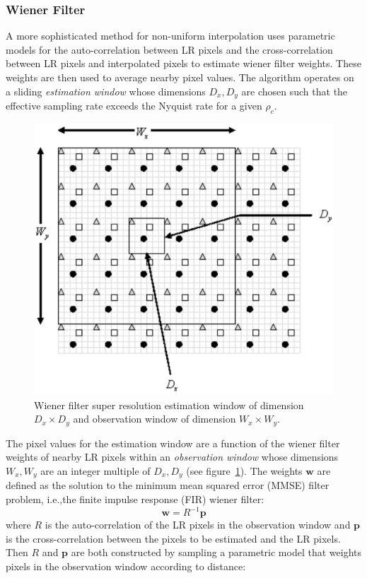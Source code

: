 \subsubsection{Wiener Filter}
A more sophisticated method for non-uniform interpolation uses parametric models for the auto-correlation between LR pixels and the cross-correlation between LR pixels and interpolated pixels to estimate wiener filter weights\cite{wiener}.
%
These weights are then used to average nearby pixel values.
%
The algorithm operates on a sliding \textit{estimation window} whose dimensions \(D_x, D_y\) are chosen such that the effective sampling rate exceeds the Nyquist rate for a given \(\rho_c\).
\begin{figure}
    \centering
    \includegraphics[width=.7\linewidth]{figures/classical/wiener.png}
    \caption{Wiener filter super resolution estimation window of dimension \(D_x \times D_y\) and observation window of dimension \(W_x \times W_y\)\cite{wiener}.}
    \label{fig:wiener}
\end{figure}
The pixel values for the estimation window are a function of the wiener filter weights of nearby LR pixels within an \textit{observation window} whose dimensions \(W_x, W_y\) are an integer multiple of \(D_x, D_y\) (see figure~\ref{fig:wiener}).
%
The weights \(\bm{w}\) are defined as the solution to the minimum mean squared error (MMSE) filter problem, i.e.,the finite impulse response (FIR) wiener filter:
\begin{equation}
    \bm{w} = R^{-1}\bm{p}
\end{equation}
where \(R\) is the auto-correlation of the LR pixels in the observation window and \(\bm{p}\) is the cross-correlation between the pixels to be estimated and the LR pixels.
%
Then \(R\) and \(\bm{p}\) are both constructed by sampling a parametric model that weights pixels in the observation window according to distance:
